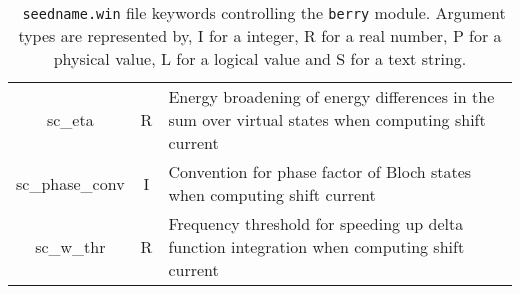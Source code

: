 \begin{table}[h!]
\begin{center}
\begin{tabular}{|c|c|p{6cm}|}
  {\sc sc\_eta} & R  & Energy broadening of energy differences in the sum over virtual states when computing shift current\\
  {\sc sc\_phase\_conv} & I  & Convention for phase factor of Bloch states when computing shift current\\
  {\sc sc\_w\_thr} & R  & Frequency threshold for speeding up delta function integration when computing shift current\\
  \hline
\end{tabular}
\caption[Parameter file keywords controlling the Berry module.]  {{\tt
    seedname.win} file keywords controlling the {\tt berry}
  module. Argument types are represented by, I for a integer, R for a
  real number, P for a physical value, L for a logical value and S for
  a text string.}
\label{parameter_keywords_berry}
\end{center}
\end{table}





